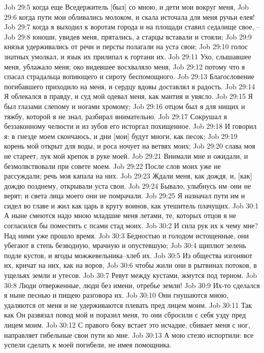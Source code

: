 Job 29:5  когда еще Вседержитель [был] со мною, и дети мои вокруг меня,
Job 29:6  когда пути мои обливались молоком, и скала источала для меня ручьи елея!
Job 29:7  когда я выходил к воротам города и на площади ставил седалище свое, --
Job 29:8  юноши, увидев меня, прятались, а старцы вставали и стояли;
Job 29:9  князья удерживались от речи и персты полагали на уста свои;
Job 29:10  голос знатных умолкал, и язык их прилипал к гортани их.
Job 29:11  Ухо, слышавшее меня, ублажало меня; око видевшее восхваляло меня,
Job 29:12  потому что я спасал страдальца вопиющего и сироту беспомощного.
Job 29:13  Благословение погибавшего приходило на меня, и сердцу вдовы доставлял я радость.
Job 29:14  Я облекался в правду, и суд мой одевал меня, как мантия и увясло.
Job 29:15  Я был глазами слепому и ногами хромому;
Job 29:16  отцом был я для нищих и тяжбу, которой я не знал, разбирал внимательно.
Job 29:17  Сокрушал я беззаконному челюсти и из зубов его исторгал похищенное.
Job 29:18  И говорил я: в гнезде моем скончаюсь, и дни [мои] будут многи, как песок;
Job 29:19  корень мой открыт для воды, и роса ночует на ветвях моих;
Job 29:20  слава моя не стареет, лук мой крепок в руке моей.
Job 29:21  Внимали мне и ожидали, и безмолвствовали при совете моем.
Job 29:22  После слов моих уже не рассуждали; речь моя капала на них.
Job 29:23  Ждали меня, как дождя, и, [как] дождю позднему, открывали уста свои.
Job 29:24  Бывало, улыбнусь им--они не верят; и света лица моего они не помрачали.
Job 29:25  Я назначал пути им и сидел во главе и жил как царь в кругу воинов, как утешитель плачущих.
Job 30:1  А ныне смеются надо мною младшие меня летами, те, которых отцов я не согласился бы поместить с псами стад моих.
Job 30:2  И сила рук их к чему мне? Над ними уже прошло время.
Job 30:3  Бедностью и голодом истощенные, они убегают в степь безводную, мрачную и опустевшую;
Job 30:4  щиплют зелень подле кустов, и ягоды можжевельника--хлеб их.
Job 30:5  Из общества изгоняют их, кричат на них, как на воров,
Job 30:6  чтобы жили они в рытвинах потоков, в ущельях земли и утесов.
Job 30:7  Ревут между кустами, жмутся под терном.
Job 30:8  Люди отверженные, люди без имени, отребье земли!
Job 30:9  Их-то сделался я ныне песнью и пищею разговора их.
Job 30:10  Они гнушаются мною, удаляются от меня и не удерживаются плевать пред лицем моим.
Job 30:11  Так как Он развязал повод мой и поразил меня, то они сбросили с себя узду пред лицем моим.
Job 30:12  С правого боку встает это исчадие, сбивает меня с ног, направляет гибельные свои пути ко мне.
Job 30:13  А мою стезю испортили: все успели сделать к моей погибели, не имея помощника.

